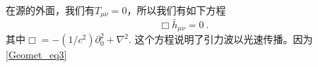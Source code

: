 在源的外面，我们有$T_{\mu\nu} = 0$，所以我们有如下方程
\begin{equation}
\Box \bar h_{\mu\nu} = 0 ~.
\end{equation}
其中$\Box = - (1/c^2) \partial_0^2 +\nabla^2$. 这个方程说明了引力波以光速传播。因为\autoref{Geomet_eq3} 
